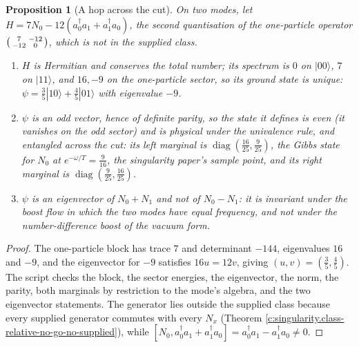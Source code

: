 \documentclass[11pt]{article}
\newtheorem{proposition}[theorem]{Proposition}
\theoremstyle{definition}
\theoremstyle{plain}
\providecommand{\ket}{}\renewcommand{\ket}[1]{|#1\rangle}
\begin{document}
\begin{proposition}[A hop across the cut]\label{c:angle.hop-across-cut}
On two modes, let $H = 7N_{0} - 12(a^{\dagger}_{0}a_{1} + a^{\dagger}_{1}a_{0})$, the second quantisation of the one-particle operator $\begin{psmallmatrix} 7 & -12 \\ -12 & 0\end{psmallmatrix}$, which is not in the supplied class.
\begin{enumerate}
\item[(i)] $H$ is Hermitian and conserves the total number; its spectrum is $0$ on $\ket{00}$, $7$ on $\ket{11}$, and $16, -9$ on the one-particle sector, so its ground state is unique: $\psi = \tfrac35\ket{10} + \tfrac45\ket{01}$ with eigenvalue $-9$.
\item[(ii)] $\psi$ is an odd vector, hence of definite parity, so the state it defines is even (it vanishes on the odd sector) and is physical under the univalence rule, and entangled across the cut: its left marginal is $\operatorname{diag}(\tfrac{16}{25}, \tfrac{9}{25})$, the Gibbs state for $N_{0}$ at $e^{-\omega/T} = \tfrac{9}{16}$, the singularity paper's sample point, and its right marginal is $\operatorname{diag}(\tfrac{9}{25}, \tfrac{16}{25})$.
\item[(iii)] $\psi$ is an eigenvector of $N_{0} + N_{1}$ and not of $N_{0} - N_{1}$: it is invariant under the boost flow in which the two modes have equal frequency, and not under the number-difference boost of the vacuum form.
\end{enumerate}
\end{proposition}
\begin{proof}
The one-particle block has trace $7$ and determinant $-144$, eigenvalues $16$ and $-9$, and the eigenvector for $-9$ satisfies $16u = 12v$, giving $(u, v) = (\tfrac35, \tfrac45)$. The script checks the block, the sector energies, the eigenvector, the norm, the parity, both marginals by restriction to the mode's algebra, and the two eigenvector statements. The generator lies outside the supplied class because every supplied generator commutes with every $N_{x}$ (Theorem \ref{c:singularity.class-relative-no-go-no-supplied}), while $[N_{0}, a^{\dagger}_{0}a_{1} + a^{\dagger}_{1}a_{0}] = a^{\dagger}_{0}a_{1} - a^{\dagger}_{1}a_{0} \neq 0$.

\end{proof}
\end{document}
